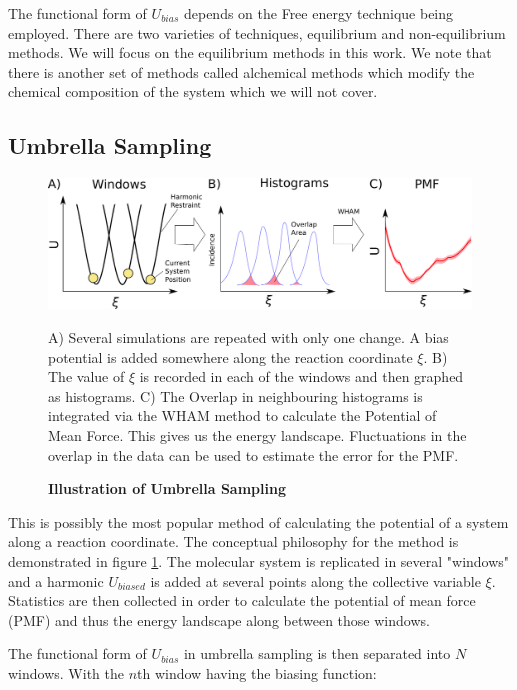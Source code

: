 The functional form of $U_{bias}$ depends on the Free energy technique being employed. There are two varieties of techniques, equilibrium and non-equilibrium methods. We will focus on the equilibrium methods in this work. We note that there is another set of methods called alchemical methods which modify the chemical composition of the system which we will not cover.

\subsection{Umbrella Sampling}
\begin{figure}
	\begin{center}
		\includegraphics[width=\textwidth]{figures/umbrella_sampling.png.pdf}
	\end{center}
	\captionsetup{singlelinecheck = false, justification=raggedright}
	\caption[Illustration of Umbrella Sampling] {\textbf{Illustration of Umbrella Sampling}}{A) Several simulations are repeated with only one change. A bias  potential is added somewhere along the reaction coordinate $\xi$. B) The value of $\xi$ is recorded in each of the windows and then graphed as histograms. C) The Overlap in neighbouring histograms is integrated via the WHAM method to calculate the Potential of Mean Force. This gives us the energy landscape. Fluctuations in the overlap in the data can be used to estimate the error for the PMF. }
	\label{umbrella_sampling_illustration}
\end{figure}

This is possibly the most popular method of calculating the potential of a system along a reaction coordinate. The conceptual philosophy for the method is demonstrated in figure \ref{umbrella_sampling_illustration}. The molecular system is replicated in several "windows" and a harmonic $U_{biased}$ is added at several points along the collective variable $\xi$. Statistics are then collected in order to calculate the potential of mean force (PMF) and thus the energy landscape along between those windows.  

The functional form of $U_{bias}$ in umbrella sampling is then separated into $N$ windows. With the $n$th window having the biasing function:


